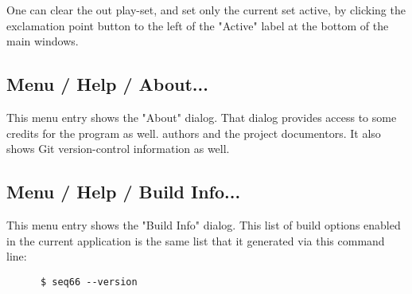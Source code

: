    One can clear the out play-set, and set only the current set active, by
   clicking the exclamation point button to the left of the "Active" label at
   the bottom of the main windows.

\subsection{Menu / Help / About...}
\label{subsec:menu_about}

   This menu entry shows the "About" dialog.
   That dialog provides access to some credits for the program as well.
   authors and the project documentors.
   It also shows Git version-control information as well.

\subsection{Menu / Help / Build Info...}
\label{subsec:menu_build_info}

   This menu entry shows the "Build Info" dialog.  This list of
   build options enabled in the current application is the same list
   that it generated via this command line:

   \begin{verbatim}
      $ seq66 --version
   \end{verbatim}

